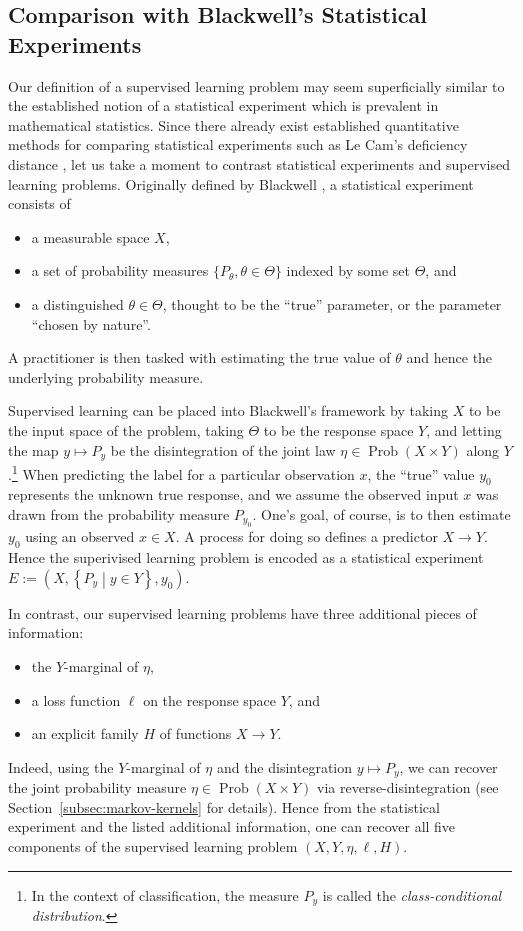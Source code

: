 \documentclass[twoside,11pt]{article}
\DeclareMathOperator{\prob}{Prob}
\newcommand{\set}[2]{\left\{ #1\middle| #2\right\}}
\begin{document}
\subsection{Comparison with Blackwell's Statistical Experiments}\label{subsec:statistical-experiments}
    Our definition of a supervised learning problem may seem superficially similar to the established notion of a statistical experiment which is prevalent in mathematical statistics. Since there already exist established quantitative methods for comparing statistical experiments such as Le Cam's deficiency distance \citep{leCam_sufficiency, mariucci2016le}, let us take a moment to contrast statistical experiments and supervised learning problems. Originally defined by Blackwell \citep{blackwell_comparison_1951}, a statistical experiment consists of
    \begin{itemize}
    \item a measurable space $X$,
    \item a set of probability measures $\{P_\theta,\theta\in \Theta\}$ indexed by some set $\Theta$, and
    \item a distinguished $\theta\in \Theta$, thought to be the ``true'' parameter, or the parameter ``chosen by nature''.
    \end{itemize}
    A practitioner is then tasked with estimating the true value of $\theta$ and hence the underlying probability measure.

    Supervised learning can be placed into Blackwell's framework \citep[c.f.][]{williamson_information_2024} by taking $X$ to be the input space of the problem, taking $\Theta$ to be the response space $Y$, and letting the map $y \mapsto P_y$ be the disintegration of the joint law $\eta \in \prob(X\times Y)$ along $Y$.\footnote{In the context of classification, the measure $P_y$ is called the \emph{class-conditional distribution}.} When predicting the label for a particular observation $x$, the ``true'' value $y_0$ represents the unknown true response, and we assume the observed input $x$ was drawn from the probability measure $P_{y_0}$. One's goal, of course, is to then estimate $y_0$ using an observed $x\in X$. A process for doing so defines a predictor $X\to Y$. Hence the superivised learning problem is encoded as a statistical experiment $E := (X,\set{P_y}{y\in Y}, y_0)$.

    In contrast, our supervised learning problems have three additional pieces of information: 
    \begin{itemize}
    \item[(1)] the $Y$-marginal of $\eta$, 
    \item[(2)] a loss function $\ell$ on the response space $Y$, and 
    \item[(3)] an explicit family $H$ of functions $X\to Y$. 
    \end{itemize}
    Indeed, using the $Y$-marginal of $\eta$ and the disintegration $y\mapsto P_{y}$, we can recover the joint probability measure $\eta \in \prob(X\times Y)$ via reverse-disintegration (see Section~\ref{subsec:markov-kernels} for details). Hence from the statistical experiment and the listed additional information, one can recover all five components of the supervised learning problem $(X,Y,\eta,\ell,H)$.
\end{document}
